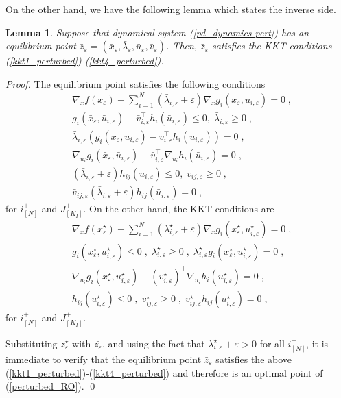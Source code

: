 \documentclass[journal,twoside,web]{ieeecolor}
\newtheorem{lemma}{Lemma}
\begin{document}
On the other hand, we have the following lemma which states the inverse side.
\begin{lemma}\label{poseqto kkt.lem_perturbed}
Suppose that dynamical system (\ref{pd_dynamics-pert}) has an equilibrium point
$\bar z_\varepsilon=(\bar x_\varepsilon,\bar \lambda_\varepsilon, \bar u_\varepsilon,\bar v_\varepsilon)$. Then, $\bar z_\varepsilon$ satisfies the KKT conditions (\ref{kkt1_perturbed})-(\ref{kkt4_perturbed}).
\end{lemma}
\begin{proof}

The equilibrium point satisfies the following conditions
\begin{align*}
&\nabla_x f(\bar x_\varepsilon)+\sum_{i=1}^N (\bar \lambda_{i,\varepsilon}+\varepsilon) \nabla_x g_i(\bar x_\varepsilon,\bar u_{i,\varepsilon})=0\;,\\
&g_{i}(\bar x_\varepsilon,\bar u_{i,\varepsilon})-\bar v_{i,\varepsilon}^\top h_i(\bar u_{i,\varepsilon})\leq 0,\;\bar \lambda_{i,\varepsilon}\geq 0\;,\\
&\bar \lambda_{i,\varepsilon}(g_{i}(\bar x_\varepsilon,\bar u_{i,\varepsilon})-\bar v_{i,\varepsilon}^\top h_i(\bar u_{i,\varepsilon}))=0\;,\\
&\nabla_{u_i} g_i(\bar x_\varepsilon,\bar u_{i,\varepsilon})-\bar v_{i,\varepsilon}^\top \nabla_{u_i} h_i(\bar u_{i,\varepsilon})=0\;,\\
&(\bar \lambda_{i,\varepsilon}+\varepsilon) h_{ij}(\bar u_{i,\varepsilon})\leq 0,\; \bar v_{ij,\varepsilon}\geq 0\;,\\
&\bar v_{ij,\varepsilon} (\bar \lambda_{i,\varepsilon}+\varepsilon) h_{ij}(\bar u_{i,\varepsilon})=0\;,
\end{align*}
for $i^+_{[N]}$ and $J^+_{[K_I]}$\;. On the other hand, the KKT conditions are
\begin{align*}
&\nabla_x f(x^\star_\varepsilon)+  \sum_{i=1}^N (\lambda_{i,\varepsilon}^\star+\varepsilon) \nabla_x g_i(x^\star_\varepsilon,u^\star_{i,\varepsilon})=0\;,\\
&g_i(x^\star_\varepsilon,u^\star_{i,\varepsilon})\leq 0\;,\;\lambda_{i,\varepsilon}^\star\geq 0\;,\;\lambda_{i,\varepsilon}^\star g_i(x^\star_\varepsilon,u^\star_{i,\varepsilon})=0\;,\\
&\nabla_{u_i}g_i(x^\star_\varepsilon,u_{i,\varepsilon}^\star)-(v_{i,\varepsilon}^\star)^\top \nabla_{u_i}h_i(u^\star_{i,\varepsilon})=0\;,\\
&h_{ij}(u_{i,\varepsilon}^\star)\leq 0\;,\;v_{ij,\varepsilon}^\star\geq 0\;,\;v_{ij,\varepsilon}^\star h_{ij}(u_{i,\varepsilon}^\star)=0\;,
\end{align*}
for $i^+_{[N]}$ and $J^+_{[K_I]}$\;.

Substituting $z_\varepsilon^\star$ with $\bar{z_\varepsilon}$, and using the fact that $\lambda_{i,\varepsilon}^\star+\varepsilon>0$ for all $i^+_{[N]}$, it is immediate to verify that the equilibrium point $\bar z_\varepsilon$ satisfies the above (\ref{kkt1_perturbed})-(\ref{kkt4_perturbed}) and therefore is an optimal point of (\ref{perturbed_RO}). \qed
\end{proof}
\end{document}
